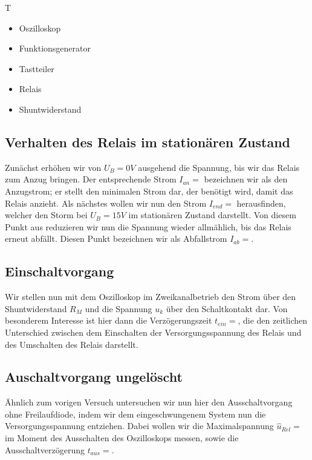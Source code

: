 \documentclass{article}
\begin{document}
\begin{devlist}
    T\begin{itemize}
        \item Oszilloskop
        \item Funktionsgenerator
        \item Tastteiler
        \item Relais
        \item Shuntwiderstand
    \end{itemize}
\end{devlist}


\subsection{Verhalten des Relais im stationären Zustand}

Zunächst erhöhen wir von $U_B = 0V$ ausgehend die Spannung, bis wir das Relais zum Anzug bringen. Der entsprechende Strom $I_{an} = $ bezeichnen wir als 
den Anzugstrom; er stellt den minimalen Strom dar, der benötigt wird, damit das Relais anzieht.
Als nächstes wollen wir nun den Strom $I_{end} = $ herausfinden, welcher den Storm bei $U_B = 15V$ im stationären Zustand darstellt. Von diesem Punkt aus
reduzieren wir nun die Spannung wieder allmählich, bis das Relais erneut abfällt. Diesen Punkt bezeichnen wir als Abfallstrom $I_{ab} = $.


\subsection{Einschaltvorgang}

Wir stellen nun mit dem Oszilloskop im Zweikanalbetrieb den Strom über den Shuntwiderstand $R_M$ und die Spannung $u_k$ über den Schaltkontakt dar.
Von besonderem Interesse ist hier dann die Verzögerungszeit $t_{ein} = $, die den zeitlichen Unterschied zwischen dem Einschalten der Versorgungsspannung des
Relais und des Umschalten des Relais darstellt.

\subsection{Auschaltvorgang ungelöscht}

Ähnlich zum vorigen Versuch untersuchen wir nun hier den Ausschaltvorgang ohne Freilaufdiode, indem wir dem eingeschwungenem System nun die 
Versorgungsspannung entziehen. Dabei wollen wir die Maximalspannung $\hat{u}_{Rel} = $ im Moment des Ausschalten des Oszilloskops messen, sowie die Ausschaltverzögerung
$t_{aus} = $.
\end{document}
